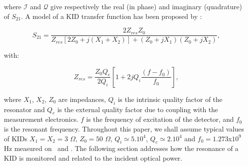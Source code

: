 \noindent where $\mathcal{I}$ and $\mathcal{Q}$ give respectively the real (in phase) and imaginary
(quadrature) of $S_{21}$. A model of a KID transfer function has been proposed
by \citet{2008ApPhL..93m4102G} :

\begin{equation}
S_{21} = \frac{2Z_{res}Z_{0}}{Z_{res}[2Z_{0} + j(X_{1}+X_{2})] + (Z_{0} +jX_{1})(Z_{0} +jX_{2})},
\end{equation}

with:

\begin{equation}
Z_{res} = \frac{Z_{0}Q_{e}}{2Q_{i}}[1 + 2jQ_{i}\frac{(f-f_{0})}{f_{0}}],
\end{equation}

\noindent where $X_{1}$, $X_{2}$, $Z_{0}$ are impedances, $Q_{i}$ is the
intrinsic quality factor of the resonator and $Q_{e}$ is the external quality
factor due to coupling with the measurement electronics. $f$ is the frequency of
excitation of the detector, and $f_{0}$ is the resonant frequency. Throughout
this paper, we shall assume typical values of KIDs $X_{1} = X_{2} = 3 $ $\Omega
$, $Z_{0} = 50$ $\Omega$, $Q_{i} \simeq 5.10^{4}$, $Q_{e} \simeq 2.10^{4}$ and
$f_{0} = 1.273$x$10^{9}$ Hz measured on \nika\ and \nikad. The following section
addresses how the resonance of a KID is monitored and related to the incident
optical power.


